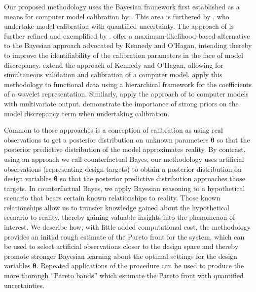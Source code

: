 \documentclass[12pt]{article}
\begin{document}
%
Our proposed methodology uses the Bayesian framework first established as a means for computer model calibration by \cite{Kennedy2001}.
% 
This area is furthered by \cite{Higdon2004}, who undertake model calibration with quantified uncertainty. 
%
%
The approach of \cite{Higdon2004} is further refined and exemplified by \cite{Williams2006}.
%
\cite{Loeppky2006} offer a maximum-likelihood-based alternative to the Bayesian approach advocated by Kennedy and O'Hagan, intending thereby to improve the identifiability of the calibration parameters in the face of model discrepancy. 
%
\cite{Bayarri2007} extend the approach of Kennedy and O'Hagan, allowing for simultaneous validation and calibration of a computer model. %
%
\cite{Bayarri} apply this methodology to functional data using a hierarchical framework for the coefficients of a wavelet representation. 
%
Similarly, \cite{Paulo2012} apply the approach of \cite{Bayarri2007} to computer models with multivariate output.
%
\cite{Brynjarsdottir2014} demonstrate the importance of strong priors on the model discrepancy term when undertaking calibration.
%

%
Common to those approaches is a conception of calibration as using real observations to get a posterior distribution on unknown parameters $\boldsymbol\theta$ so that the posterior predictive distribution of the model approximates reality.
%
By contrast, using an approach we call counterfactual Bayes, our methodology uses artificial observations (representing design targets) to obtain a posterior distribution on design variables $\boldsymbol\theta$ so that the posterior predictive distribution approaches those targets.
%
In counterfactual Bayes, we apply Bayesian reasoning to a hypothetical scenario that bears certain known relationships to reality.
%
Those known relationships allow us to transfer knowledge gained about the hypothetical scenario to reality, thereby gaining valuable insights into the phenomenon of interest.
%
We describe how, with little added computational cost, the methodology provides an initial rough estimate of the Pareto front for the system, which can be used to select artificial observations closer to the design space and thereby promote stronger Bayesian learning about the optimal settings for the design variables $\boldsymbol\theta$.
%
Repeated applications of the procedure can be used to produce the more thorough ``Pareto bands'' which estimate the Pareto front with quantified uncertainties.
%
\end{document}
